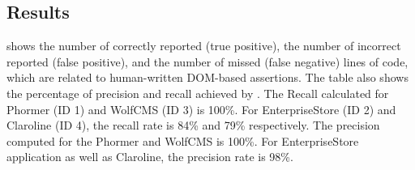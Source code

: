 \subsection{Results} \label{Sec:results}
 shows the number of  correctly reported (true positive), the number of incorrect reported (false positive), and the number of missed (false negative) \javascript lines of code, which are related to human-written DOM-based assertions. The table also shows the percentage of precision and recall achieved by \atrina. The Recall calculated for Phormer (ID 1) and WolfCMS (ID 3) is 100\%. For EnterpriseStore (ID 2) and Claroline (ID 4), the recall rate is 84\% and 79\% respectively. The precision computed for the Phormer and WolfCMS is 100\%. For EnterpriseStore application as well as Claroline, the precision rate is 98\%.


